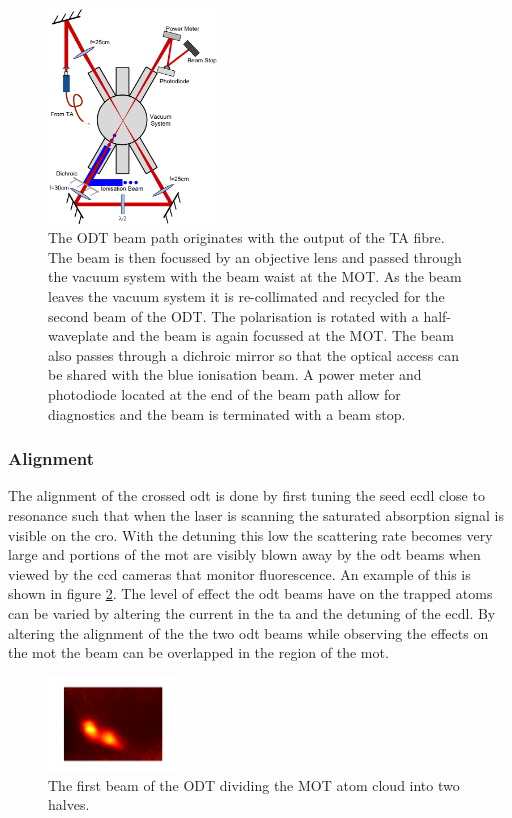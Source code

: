 \begin{figure}[h]
\centering
\includegraphics[width=0.4\textwidth]{figs/DipoleTrapRig.pdf}
\caption{The ODT beam path originates with the output of the TA fibre. The beam is then focussed by an objective lens and passed through the vacuum system with the beam waist at the MOT. As the beam leaves the vacuum system it is re-collimated and recycled for the second beam of the ODT. The polarisation is rotated with a half-waveplate and the beam is again focussed at the MOT. The beam also passes through a dichroic mirror so that the optical access can be shared with the blue ionisation beam. A power meter and photodiode located at the end of the beam path allow for diagnostics and the beam is terminated with a beam stop.}
\label{fig:dipole_rig}
\end{figure}

\subsubsection{Alignment}

The alignment of the crossed \gls{odt} is done by first tuning the seed \gls{ecdl} close to resonance such that when the laser is scanning the saturated absorption signal is visible on the \gls{cro}. With the detuning this low the scattering rate becomes very large and portions of the \gls{mot} are visibly blown away by the \gls{odt} beams when viewed by the \gls{ccd} cameras that monitor fluorescence. An example of this is shown in figure \ref{fig:mot_slice}. The level of effect the \gls{odt} beams have on the trapped atoms can be varied by altering the current in the \gls{ta} and the detuning of the \gls{ecdl}. By altering the alignment of the the two \gls{odt} beams while observing the effects on the \gls{mot} the beam can be overlapped in the region of the \gls{mot}.

\begin{figure}[H]
\centering
\includegraphics[width=0.3\textwidth]{figs/mot_slice.pdf}
\caption{The first beam of the ODT dividing the MOT atom cloud into two halves.}
\label{fig:mot_slice}
\end{figure}

